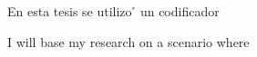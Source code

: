 En esta tesis se utilizo ́ un codificador




I will base my research on a scenario where


















































































































